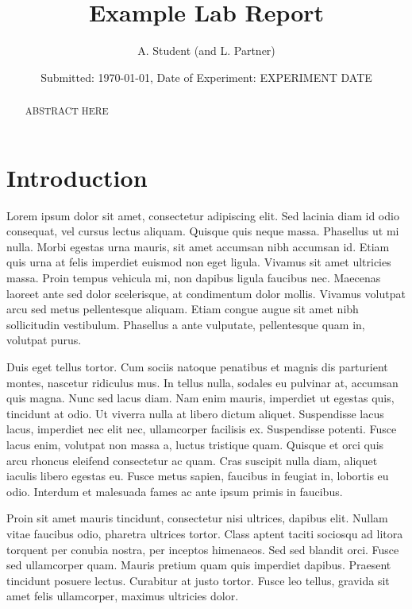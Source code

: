 \documentclass[10pt, onecolumn]{revtex4}    %
\begin{document}
                     


\title{Example Lab Report} 
\date{Submitted: \today{}, Date of Experiment: EXPERIMENT DATE}
\author{A. Student (and L. Partner)}

\begin{abstract}              
 
ABSTRACT HERE

\end{abstract}

\maketitle
\thispagestyle{plain} %



\section{Introduction} 

Lorem ipsum dolor sit amet, consectetur adipiscing elit. Sed lacinia diam id odio consequat, vel cursus lectus aliquam. Quisque quis neque massa. Phasellus ut mi nulla. Morbi egestas urna mauris, sit amet accumsan nibh accumsan id. Etiam quis urna at felis imperdiet euismod non eget ligula. Vivamus sit amet ultricies massa. Proin tempus vehicula mi, non dapibus ligula faucibus nec. Maecenas laoreet ante sed dolor scelerisque, at condimentum dolor mollis. Vivamus volutpat arcu sed metus pellentesque aliquam. Etiam congue augue sit amet nibh sollicitudin vestibulum. Phasellus a ante vulputate, pellentesque quam in, volutpat purus.

Duis eget tellus tortor. Cum sociis natoque penatibus et magnis dis parturient montes, nascetur ridiculus mus. In tellus nulla, sodales eu pulvinar at, accumsan quis magna. Nunc sed lacus diam. Nam enim mauris, imperdiet ut egestas quis, tincidunt at odio. Ut viverra nulla at libero dictum aliquet. Suspendisse lacus lacus, imperdiet nec elit nec, ullamcorper facilisis ex. Suspendisse potenti. Fusce lacus enim, volutpat non massa a, luctus tristique quam. Quisque et orci quis arcu rhoncus eleifend consectetur ac quam. Cras suscipit nulla diam, aliquet iaculis libero egestas eu. Fusce metus sapien, faucibus in feugiat in, lobortis eu odio. Interdum et malesuada fames ac ante ipsum primis in faucibus.

Proin sit amet mauris tincidunt, consectetur nisi ultrices, dapibus elit. Nullam vitae faucibus odio, pharetra ultrices tortor. Class aptent taciti sociosqu ad litora torquent per conubia nostra, per inceptos himenaeos. Sed sed blandit orci. Fusce sed ullamcorper quam. Mauris pretium quam quis imperdiet dapibus. Praesent tincidunt posuere lectus. Curabitur at justo tortor. Fusce leo tellus, gravida sit amet felis ullamcorper, maximus ultricies dolor.
\end{document}

